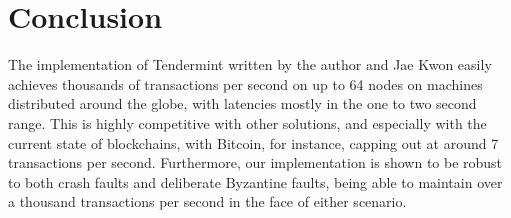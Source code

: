 \section{Conclusion}

The implementation of Tendermint written by the author and Jae Kwon easily achieves 
thousands of transactions per second on up to 64 nodes on machines distributed around the globe, 
with latencies mostly in the one to two second range.
This is highly competitive with other solutions, and especially with the current state of blockchains,
with Bitcoin, for instance, capping out at around 7 transactions per second.
Furthermore, our implementation is shown to be robust to both crash faults and deliberate Byzantine faults,
being able to maintain over a thousand transactions per second in the face of either scenario.


